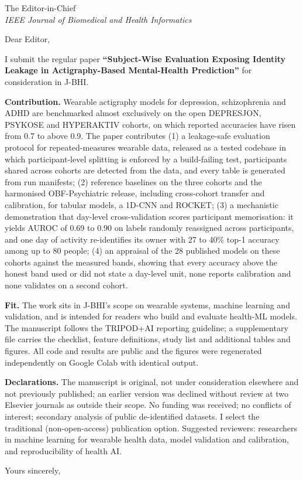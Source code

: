 \documentclass[11pt,a4paper]{letter}
\date{\today}
\begin{document}
\begin{letter}{The Editor-in-Chief\\\emph{IEEE Journal of Biomedical and Health Informatics}}
\opening{Dear Editor,}
I submit the regular paper \textbf{``Subject-Wise Evaluation Exposing Identity Leakage in Actigraphy-Based Mental-Health Prediction''} for consideration in J-BHI.

\textbf{Contribution.} Wearable actigraphy models for depression, schizophrenia and ADHD are benchmarked almost exclusively on the open DEPRESJON, PSYKOSE and HYPERAKTIV cohorts, on which reported accuracies have risen from 0.7 to above 0.9. The paper contributes (1) a leakage-safe evaluation protocol for repeated-measures wearable data, released as a tested codebase in which participant-level splitting is enforced by a build-failing test, participants shared across cohorts are detected from the data, and every table is generated from run manifests; (2) reference baselines on the three cohorts and the harmonised OBF-Psychiatric release, including cross-cohort transfer and calibration, for tabular models, a 1D-CNN and ROCKET; (3) a mechanistic demonstration that day-level cross-validation scores participant memorisation: it yields AUROC of 0.69 to 0.90 on labels randomly reassigned across participants, and one day of activity re-identifies its owner with 27 to 40\% top-1 accuracy among up to 80 people; (4) an appraisal of the 28 published models on these cohorts against the measured bands, showing that every accuracy above the honest band used or did not state a day-level unit, none reports calibration and none validates on a second cohort.

\textbf{Fit.} The work sits in J-BHI's scope on wearable systems, machine learning and validation, and is intended for readers who build and evaluate health-ML models. The manuscript follows the TRIPOD+AI reporting guideline; a supplementary file carries the checklist, feature definitions, study list and additional tables and figures. All code and results are public and the figures were regenerated independently on Google Colab with identical output.

\textbf{Declarations.} The manuscript is original, not under consideration elsewhere and not previously published; an earlier version was declined without review at two Elsevier journals as outside their scope. No funding was received; no conflicts of interest; secondary analysis of public de-identified datasets. I select the traditional (non-open-access) publication option. Suggested reviewers: researchers in machine learning for wearable health data, model validation and calibration, and reproducibility of health AI.
\closing{Yours sincerely,}
\end{letter}
\end{document}
